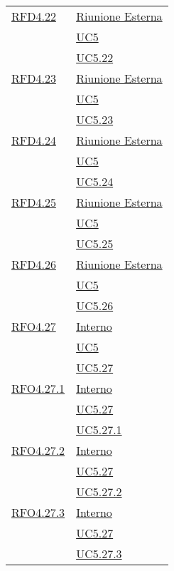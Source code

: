 \begin{longtable}{|>{\centering}m{5cm}|m{5cm}<{\centering}|}
\hyperlink{RFD4.22}{RFD4.22} &   \hyperlink{Riunione Esterna}{Riunione Esterna}\\ &\hyperref[UC5]{UC5}\\ &\hyperref[UC5.22]{UC5.22}\\ \hline

\hyperlink{RFD4.23}{RFD4.23} & \hyperlink{Riunione Esterna}{Riunione Esterna}\\ &\hyperref[UC5]{UC5}\\  &\hyperref[UC5.23]{UC5.23}\\ \hline

\hyperlink{RFD4.24}{RFD4.24} & \hyperlink{Riunione Esterna}{Riunione Esterna}\\ &\hyperref[UC5]{UC5}\\ &\hyperref[UC5.24]{UC5.24}\\ \hline

\hyperlink{RFD4.25}{RFD4.25} & \hyperlink{Riunione Esterna}{Riunione Esterna}\\ &\hyperref[UC5]{UC5}\\  &\hyperref[UC5.25]{UC5.25}\\ \hline

\hyperlink{RFD4.26}{RFD4.26}  &  \hyperlink{Riunione Esterna}{Riunione Esterna}\\ &\hyperref[UC5]{UC5}\\ &\hyperref[UC5.26]{UC5.26}\\ \hline

\hyperlink{RFO4.27}{RFO4.27} &  \hyperlink{Interno}{Interno}\\ &\hyperref[UC5]{UC5}\\ &\hyperref[UC5.27]{UC5.27}\\ \hline

\hyperlink{RFO4.27.1}{RFO4.27.1} &  \hyperlink{Interno}{Interno}\\ &\hyperref[UC5.27]{UC5.27}\\ &\hyperref[UC5.27.1]{UC5.27.1}\\ \hline

\hyperlink{RFO4.27.2}{RFO4.27.2} &  \hyperlink{Interno}{Interno}\\ &\hyperref[UC5.27]{UC5.27}\\ &\hyperref[UC5.27.2]{UC5.27.2}\\ \hline

\hyperlink{RFO4.27.3}{RFO4.27.3} &  \hyperlink{Interno}{Interno}\\ &\hyperref[UC5.27]{UC5.27}\\ &\hyperref[UC5.27.3]{UC5.27.3}\\ \hline


\end{longtable}
